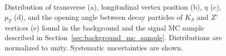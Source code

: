 \begin{figure}[!htb]
    \centering
     \\
     \\
    \caption{Distribution of transverse (a), longitudinal vertex position (b), $\eta$ (c), $p_{T}$ (d), and the opening angle between decay particles of $K_{S}$ and $Z'$ vertices (e) found in the background and the signal MC sample described in Section~\ref{sec:background_mc_sample}. Distributions are normalized to unity. Systematic uncertainties are shown.}
    \label{fig:Ks_zp_comparison}
\end{figure}

